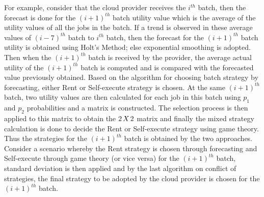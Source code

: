 \documentclass[conference]{IEEEtran}
\begin{document}
For example, consider that the cloud provider receives the $i^{th}$ batch, then the forecast is done for the $(i+1)^{th}$ batch utility value which is the average of the utility values of all the jobs in the batch. If a trend is observed in these average values of $(i-7)^{th}$ batch to $i^{th}$ batch, then the forecast for the $(i+1)^{th}$ batch utility is obtained using Holt's Method; else exponential smoothing is adopted. Then when the $(i+1)^{th}$ batch is received by the provider, the average actual utility of the $(i+1)^{th}$ batch is computed and is compared with the forecasted value previously obtained. Based on the algorithm for choosing batch strategy by forecasting, either Rent or Self-execute strategy is chosen. At the same $(i+1)^{th}$ batch, two utility values are then calculated for each job in this batch using $p_1$ and $p_2$ probabilities and a matrix is constructed. The selection process is then applied to this matrix to obtain the $2\hspace*{0.5mm}X\hspace*{0.5mm}2$ matrix and finally the mixed strategy calculation is done to decide the Rent or Self-execute strategy using game theory. Thus the strategies for the $(i+1)^{th}$ batch is obtained by the two approaches. Consider a scenario whereby the Rent strategy is chosen through forecasting and Self-execute through game theory (or vice versa) for the $(i+1)^{th}$ batch, standard deviation is then applied and by the last algorithm on conflict of strategies, the final strategy to be adopted by the cloud provider is chosen for the $(i+1)^{th}$ batch.
\end{document}
